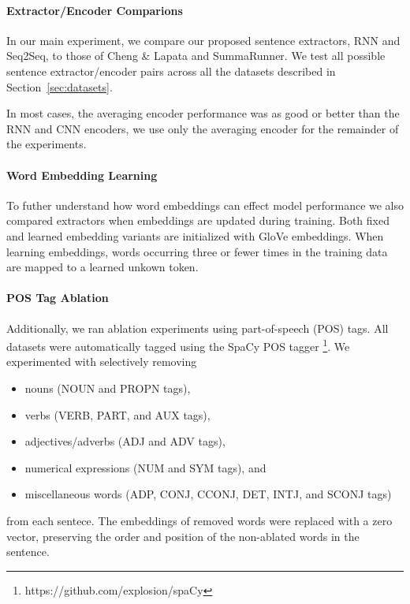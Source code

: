 \paragraph{Extractor/Encoder Comparions}{
In our main experiment, we compare our proposed 
sentence extractors, RNN and Seq2Seq,
to those of Cheng \& Lapata and SummaRunner.
We test all possible sentence extractor/encoder pairs across all the datasets
described in Section~\ref{sec:datasets}.} 


In most cases, the averaging encoder performance was as good or better than
the RNN and CNN encoders, we use only the averaging encoder for the remainder
of the experiments.

\paragraph{Word Embedding Learning}{To futher understand how word 
embeddings 
can
effect model performance we also compared extractors when embeddings 
are updated during training. Both fixed and learned embedding variants are 
initialized with GloVe embeddings. When learning embeddings, words occurring 
three or fewer times in the training data are mapped to a learned unkown
token.}

\paragraph{POS Tag Ablation}{Additionally, we ran ablation experiments
using part-of-speech (POS) tags. 
All datasets were automatically tagged using
the SpaCy POS tagger \footnote{https://github.com/explosion/spaCy}.   
We experimented with selectively removing 
\begin{itemize}
    \item nouns (NOUN and PROPN tags), 
    \item verbs (VERB, PART, and AUX tags), 
    \item adjectives/adverbs (ADJ and ADV tags), 
    \item numerical expressions (NUM and SYM tags), and 
    \item miscellaneous words (ADP, CONJ, CCONJ, DET, INTJ, and SCONJ tags)
\end{itemize}
from each sentece. 
The embeddings of removed words were replaced with a zero vector,
preserving the order and position of the non-ablated words in the sentence.
}

